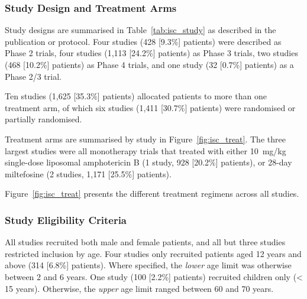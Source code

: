 \subsubsection{Study Design and Treatment Arms}


Study designs are summarised in Table~\ref{tab:isc_study} as described in the publication or protocol. Four studies (428 [9.3\%] patients) were described as Phase 2 trials\cite{sundar2008,sundar2008B,sundar2011,sundar2015}, four studies (1,113 [24.2\%] patients) as Phase 3 trials\cite{sundar2007a,sundar2009,sundar2010,sundar2014}, two studies (468 [10.2\%] patients) as Phase 4 trials\cite{koirala2003,bhattacharya2007}, and one study (32 [0.7\%] patients) as a Phase 2/3 trial\cite{rijal2010a}.

Ten studies (1,625 [35.3\%] patients) allocated patients to more than one treatment arm\cite{das2009, sundar2007a,sundar2008, sundar2009, sundar2010, sundar2014, sundar2015, sundar2008B, chakraborty2008, rijal2010b}, of which six studies (1,411 [30.7\%] patients) were randomised\cite{das2009,sundar2007a,sundar2009,sundar2010,sundar2014} or partially randomised\cite{sundar2008}.

Treatment arms are summarised by study in Figure~\ref{fig:isc_treat}. The three largest studies were all monotherapy trials that treated with either 10~mg/kg single-dose liposomal amphotericin B (1 study, 928 [20.2\%] patients)\cite{sundar2019}, or 28-day miltefosine (2 studies, 1,171 [25.5\%] patients).

Figure~\ref{fig:isc_treat} presents the different treatment regimens across all studies.

\subsubsection{Study Eligibility Criteria}

All studies recruited both male and female patients, and all but three studies restricted inclusion by age. Four studies only recruited patients aged 12 years and above (314 [6.8\%] patients)\cite{sundar2015,sundar2008B,sundar2008,rijal2010a}. Where specified, the \textit{lower} age limit was otherwise between 2 and 6 years. One study (100 [2.2\%] patients) recruited children only (< 15 years)\cite{pandey2017}. Otherwise, the \textit{upper} age limit ranged between 60 and 70 years.

